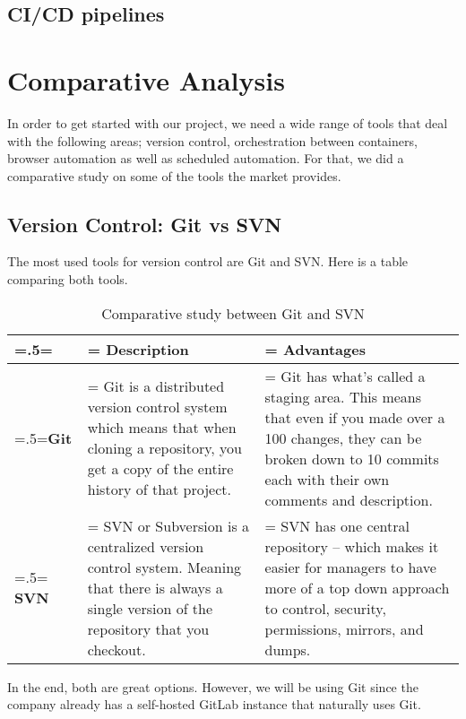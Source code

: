 \subsection{CI/CD pipelines}
\lipsum[2][1]

\section{Comparative Analysis}
In order to get started with our project, we need a wide range of tools that deal with the following areas; version control, orchestration between containers, browser automation as well as scheduled automation. For that, we did a comparative study on some of the tools the market provides.

\subsection{Version Control: Git vs SVN}
The most used tools for version control are Git and SVN. Here is a table comparing both tools.
\begin{table}[H]
    \renewcommand{\arraystretch}{1.5}%
    \caption{Comparative study between Git and SVN}
    \centering
    \medskip
    \begin{tabularx}{1\textwidth} {
            | >{\hsize=.5\hsize\linewidth=\hsize\centering\arraybackslash}X
            | >{\hsize=1.25\hsize\linewidth=\hsize\justifying\arraybackslash}X
            | >{\hsize=1.25\hsize\linewidth=\hsize\justifying\arraybackslash}X |}
        \hline
        \rowcolor{primary} & \textbf {Description}                                                                                                                                   & \textbf {Advantages}                                                                                                                                                                     \\
        \hline
        \textbf{Git}       & \noindent Git is a distributed version control system which means that when cloning a repository, you get a copy of the entire history of that project. & \noindent Git has what's called a staging area. This means that even if you made over a 100 changes, they can be broken down to 10 commits each with their own comments and description. \\
        \hline
        \textbf{SVN}       & \noindent SVN or Subversion is a centralized version control system. Meaning that there is always a single version of the repository that you checkout. & \noindent SVN has one central repository – which makes it easier for managers to have more of a top down approach to control, security, permissions, mirrors, and dumps.                 \\
        \hline
    \end{tabularx}
\end{table}
In the end, both are great options. However, we will be using Git since the company already has a self-hosted GitLab instance that naturally uses Git.

